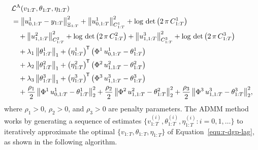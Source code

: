\begin{align}
	&\mathcal{L}^\mathrm{A}(v_{1:T}, \theta_{1:T}, \eta_{1:T}) \nonumber\\
	&= \big \lVert u^1_{0, 1:T} - y_{1:T} \big \rVert^2_{\Xi_{1:T}} + \big \lVert u^1_{0, 1:T} \big \rVert^2_{C^1_{1:T}} + \log \,\det\big(2 \, \pi \, C^1_{1:T}\big) \nonumber\\
	&\quad+ \big \lVert u^2_{1, 1:T} \big \rVert^2_{C^2_{1:T}} + \log \,\det\big(2 \, \pi \, C^2_{1:T}\big) + \big \lVert u^3_{1, 1:T} \big \rVert^2_{C^3_{1:T}} + \log \,\det\big(2 \, \pi \, C^3_{1:T}\big) \nonumber\\
	&\quad+ \lambda_1  \, \big \lVert \theta^1_{1:T} \big \rVert_1 + \big(\eta^1_{1:T}\big)^{\mkern-1.5mu\mathsf{T}} \, \big(\Phi^1 \, u^1_{0,1:T} - \theta^1_{1:T}\big) \label{equ:r-dgp-lag}\\
	&\quad+ \lambda_2  \, \big \lVert \theta^2_{1:T} \big \rVert_1 + \big(\eta^2_{1:T}\big)^{\mkern-1.5mu\mathsf{T}} \, \big(\Phi^2 \, u^2_{1,1:T} - \theta^2_{1:T}\big) \nonumber\\
	&\quad+ \lambda_3  \, \big \lVert \theta^3_{1:T} \big \rVert_1 + \big(\eta^3_{1:T}\big)^{\mkern-1.5mu\mathsf{T}} \, \big(\Phi^3 \, u^3_{1,1:T} - \theta^3_{1:T}\big) \nonumber\\
	&\quad+ \frac{\rho_1}{2} \,  \big \lVert \Phi^1 \, u^1_{0,1:T} - \theta^1_{1:T} \big \rVert^2_2 + \frac{\rho_2}{2} \,  \big \lVert \Phi^2 \, u^2_{1,1:T} - \theta^2_{1:T} \big \rVert^2_2 + \frac{\rho_3}{2} \,  \big \lVert \Phi^3 \, u^3_{1,1:T} - \theta^3_{1:T} \big \rVert^2_2,\nonumber
\end{align}
%
where $\rho_1>0$, $\rho_2>0$, and $\rho_3>0$ are penalty parameters. The ADMM method works by generating a sequence of estimates $\big\lbrace v^{(i)}_{1:T}, \theta^{(i)}_{1:T}, \eta^{(i)}_{1:T} \colon i=0,1,\ldots\big\rbrace$ to iteratively approximate the optimal $\lbrace v_{1:T}, \theta_{1:T}, \eta_{1:T}\rbrace$ of Equation~\eqref{equ:r-dgp-lag}, as shown in the following algorithm.

